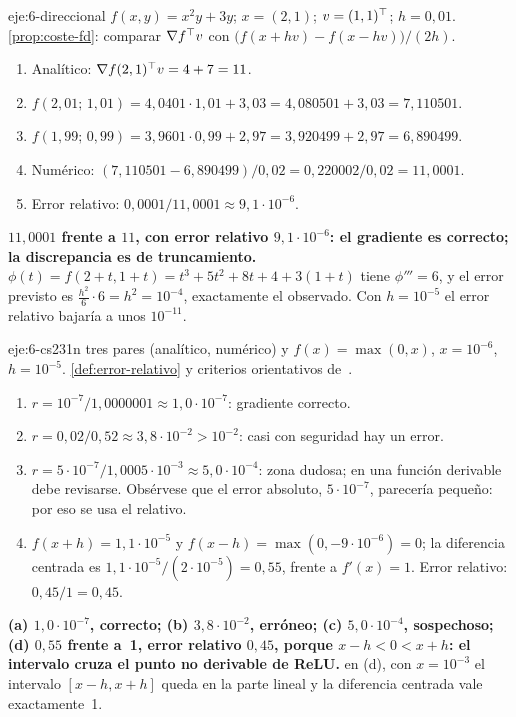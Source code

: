 \begin{solucion}{eje:6-direccional}
\datos $f(x,y)=x^{2}y+3y$; $x=(2,1)$; $v=(1,1)^{\top}$; $h=0{,}01$.
\planteamiento \cref{prop:coste-fd}: comparar $\nabla f^{\top} v$ con $\bigl(f(x+hv)-f(x-hv)\bigr)/(2h)$.
\pasos
\begin{enumerate}[label=\arabic*.]
  \item Analítico: $\nabla f(2,1)^{\top} v=4+7=11$.
  \item $f(2{,}01;\,1{,}01)=4{,}0401\cdot 1{,}01+3{,}03=4{,}080501+3{,}03=7{,}110501$.
  \item $f(1{,}99;\,0{,}99)=3{,}9601\cdot 0{,}99+2{,}97=3{,}920499+2{,}97=6{,}890499$.
  \item Numérico: $(7{,}110501-6{,}890499)/0{,}02=0{,}220002/0{,}02=11{,}0001$.
  \item Error relativo: $0{,}0001/11{,}0001\approx 9{,}1\cdot 10^{-6}$.
\end{enumerate}
\resultado \textbf{$11{,}0001$ frente a $11$, con error relativo $9{,}1\cdot 10^{-6}$: el gradiente es correcto; la discrepancia es de truncamiento.}
\comprobacion $\phi(t)=f(2+t,1+t)=t^{3}+5t^{2}+8t+4+3(1+t)$ tiene $\phi'''=6$, y el error previsto es $\tfrac{h^{2}}{6}\cdot 6=h^{2}=10^{-4}$, exactamente el observado. Con $h=10^{-5}$ el error relativo bajaría a unos $10^{-11}$.
\end{solucion}

\begin{solucion}{eje:6-cs231n}
\datos tres pares (analítico, numérico) y $f(x)=\max(0,x)$, $x=10^{-6}$, $h=10^{-5}$.
\planteamiento \cref{def:error-relativo} y criterios orientativos de~\cite{cs231n}.
\pasos
\begin{enumerate}[label=(\alph*)]
  \item $r=10^{-7}/1{,}0000001\approx 1{,}0\cdot 10^{-7}$: gradiente correcto.
  \item $r=0{,}02/0{,}52\approx 3{,}8\cdot 10^{-2}>10^{-2}$: casi con seguridad hay un error.
  \item $r=5\cdot 10^{-7}/1{,}0005\cdot 10^{-3}\approx 5{,}0\cdot 10^{-4}$: zona dudosa; en una función derivable debe revisarse. Obsérvese que el error absoluto, $5\cdot 10^{-7}$, parecería pequeño: por eso se usa el relativo.
  \item $f(x+h)=1{,}1\cdot 10^{-5}$ y $f(x-h)=\max(0,-9\cdot 10^{-6})=0$; la diferencia centrada es $1{,}1\cdot 10^{-5}/(2\cdot 10^{-5})=0{,}55$, frente a $f'(x)=1$. Error relativo: $0{,}45/1=0{,}45$.
\end{enumerate}
\resultado \textbf{(a) $1{,}0\cdot 10^{-7}$, correcto; (b) $3{,}8\cdot 10^{-2}$, erróneo; (c) $5{,}0\cdot 10^{-4}$, sospechoso; (d) $0{,}55$ frente a~1, error relativo $0{,}45$, porque $x-h<0<x+h$: el intervalo cruza el punto no derivable de ReLU.}
\comprobacion en (d), con $x=10^{-3}$ el intervalo $[x-h,x+h]$ queda en la parte lineal y la diferencia centrada vale exactamente~1.
\end{solucion}

